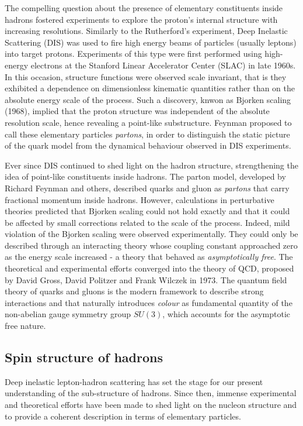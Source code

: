 The compelling question about the presence of elementary constituents inside hadrons fostered experiments to explore the proton's internal structure with increasing resolutions. Similarly to the Rutherford's experiment, Deep Inelastic Scattering (DIS) was used to fire high energy beams of particles (usually leptons) into target protons. Experiments of this type were first performed using high-energy electrons at the Stanford Linear Accelerator Center (SLAC) in late 1960s. In this occasion, structure functions were observed scale invariant, that is they exhibited a dependence on dimensionless kinematic quantities rather than on the absolute energy scale of the process. Such a discovery, knwon as Bjorken scaling (1968), implied that the proton structure was independent of the absolute resolution scale, hence revealing a point-like substructure. Feynman proposed to call these elementary particles \textit{partons}, in order to distinguish the static picture of the quark model from the dynamical behaviour observed in DIS experiments.%

Ever since DIS continued to shed light on the hadron structure, strengthening the idea of point-like constituents inside hadrons. The parton model, developed by Richard Feynman and others, described quarks and gluon as \textit{partons} that carry fractional momentum inside hadrons. However, calculations in perturbative theories predicted that Bjorken scaling could not hold exactly and that it could be affected by small corrections related to the scale of the process. Indeed, mild violation of the Bjorken scaling were observed experimentally. They could only be described through an interacting theory whose coupling constant approached zero as the energy scale increased - a theory that behaved as \textit{asymptotically free}. The theoretical and experimental efforts converged into the theory of QCD, proposed by David Gross, David Politzer and Frank Wilczek in 1973. The quantum field theory of quarks and gluons is the modern framework to describe strong interactions and that naturally introduces \textit{colour} as fundamental quantity of the non-abelian gauge symmetry group $SU(3)$, which accounts for the asymptotic free nature.


\subsection*{Spin structure of hadrons}

Deep inelastic lepton-hadron scattering has set the stage for our present understanding of the sub-structure of hadrons. Since then, immense experimental and theoretical efforts have been made to shed light on the nucleon structure and to provide a coherent description in terms of elementary particles.%

